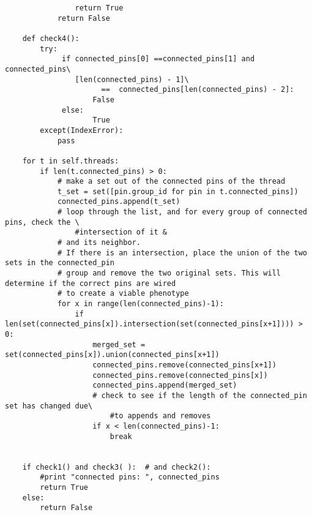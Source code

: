 \documentclass[a4paper]{article}
\begin{document}
\begin{enumerate}
\begin{verbatim}
                return True
            return False

    def check4():
        try:
             if connected_pins[0] ==connected_pins[1] and connected_pins\
                [len(connected_pins) - 1]\
                      ==  connected_pins[len(connected_pins) - 2]: 
                    False
             else:
                    True
        except(IndexError):
            pass

    for t in self.threads:
        if len(t.connected_pins) > 0:
            # make a set out of the connected pins of the thread
            t_set = set([pin.group_id for pin in t.connected_pins])
            connected_pins.append(t_set)
            # loop through the list, and for every group of connected pins, check the \
                #intersection of it &
            # and its neighbor.
            # If there is an intersection, place the union of the two sets in the connected_pin
            # group and remove the two original sets. This will determine if the correct pins are wired
            # to create a viable phenotype
            for x in range(len(connected_pins)-1):
                if len(set(connected_pins[x]).intersection(set(connected_pins[x+1]))) > 0:
                    merged_set = set(connected_pins[x]).union(connected_pins[x+1])
                    connected_pins.remove(connected_pins[x+1])
                    connected_pins.remove(connected_pins[x])
                    connected_pins.append(merged_set)
                    # check to see if the length of the connected_pin set has changed due\
                        #to appends and removes
                    if x < len(connected_pins)-1:
                        break


    if check1() and check3( ):  # and check2():
        #print "connected pins: ", connected_pins
        return True
    else:
        return False
\end{verbatim}
\end{enumerate}
\end{document}
